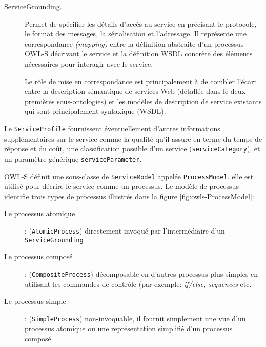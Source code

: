 \begin{description}
    \item[ServiceGrounding.] Permet de spécifier les détails d'accès
      au service en précisant le protocole, le format des messages, la
      sérialisation et l'adressage. Il représente une correspondance
      \textit{(mapping)} entre la définition abstraite d'un processus
      \textsc{OWL-S} décrivant le service et la définition
      \textsc{WSDL} concrète des éléments nécessaires pour interagir
      avec le service.

      Le rôle de mise en correspondance est principalement à de
      combler l'écart entre la description sémantique de services Web
      (détallée dans le deux premières sous-ontologies) et les
      modèles de description de service existants qui sont
      principalement syntaxique (\textsc{WSDL}).
    \end{description}

    Le \verb|ServiceProfile| fournissent éventuellement d'autres
    informations supplémentaires sur le service comme la qualité qu'il
    assure en terme du temps de réponse et du coût, une classification
    possible d'un service (\verb|serviceCategory|), et un paramètre
    générique \verb|serviceParameter|.

    
    \textsc{OWL-S} définit une sous-classe de \verb|ServiceModel|
    appelée \verb|ProcessModel|. elle est utilisé pour décrire le
    service comme un processus. Le modèle de processus identifie trois
    types de processus illustrés dans la figure
    \ref{fig:owls-ProcessModel}:

    \renewcommand{\descriptionlabel}[1]{\hspace{1cm}\textbullet~\textsf{#1}}
    \begin{description}
    \item[Le processus atomique]: (\verb|AtomicProcess|) directement
      invoqué par l'intermédiaire d'un \verb|ServiceGrounding|
      
    \item[Le processus composé]: (\verb|CompositeProcess|)
      décomposable en d'autres processus plus simples en utilisant les
      commandes de contrôle (par exemple: \textit{if/else, sequences}
      etc.
        
    \item[Le processus simple]: (\verb|SimpleProcess|) non-invoquable,
      il fournit simplement une vue d'un processus atomique ou une
      représentation simplifié d’un processus composé.
    \end{description}

